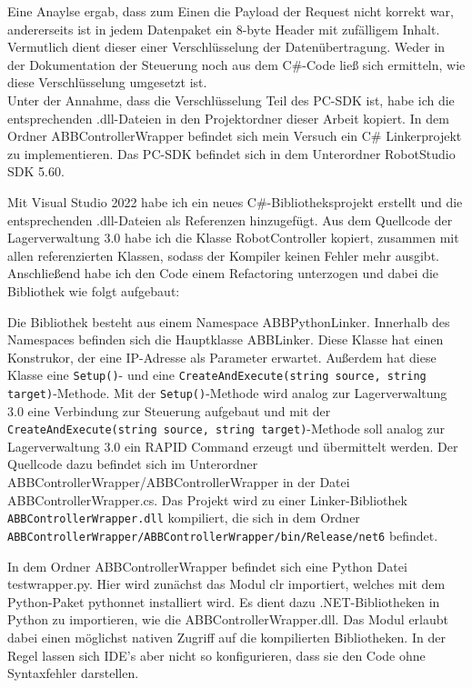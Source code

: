 Eine Anaylse ergab, dass zum Einen die Payload der Request nicht korrekt war, andererseits ist in jedem Datenpaket ein 8-byte Header mit zufälligem Inhalt.
Vermutlich dient dieser einer Verschlüsselung der Datenübertragung. 
Weder in der Dokumentation der Steuerung noch aus dem C\#-Code ließ sich ermitteln, wie diese Verschlüsselung umgesetzt ist.
\\

Unter der Annahme, dass die Verschlüsselung Teil des PC-SDK ist, habe ich die entsprechenden \glq .dll\grq{}-Dateien in den Projektordner dieser Arbeit kopiert.
In dem Ordner \grq ABBControllerWrapper\grq{} befindet sich mein Versuch ein C\# Linkerprojekt zu implementieren. 
Das PC-SDK befindet sich in dem Unterordner \grq RobotStudio SDK 5.60\grq{}.

Mit Visual Studio 2022 habe ich ein neues C\#-Bibliotheksprojekt erstellt und die entsprechenden \glq .dll\grq{}-Dateien als Referenzen hinzugefügt.
Aus dem Quellcode der Lagerverwaltung 3.0 habe ich die Klasse \glq RobotController\grq{} kopiert, zusammen mit allen referenzierten Klassen, sodass der Kompiler keinen Fehler mehr ausgibt.
Anschließend habe ich den Code einem Refactoring unterzogen und dabei die Bibliothek wie folgt aufgebaut:

Die Bibliothek besteht aus einem Namespace \glq ABBPythonLinker\grq{}.
Innerhalb des Namespaces befinden sich die Hauptklasse \glq ABBLinker\grq{}. 
Diese Klasse hat einen Konstrukor, der eine IP-Adresse als Parameter erwartet.
Außerdem hat diese Klasse eine \verb|Setup()|- und eine \verb|CreateAndExecute(string source, string target)|-Methode. 
Mit der \verb|Setup()|-Methode wird analog zur Lagerverwaltung 3.0 eine Verbindung zur Steuerung aufgebaut und mit der 
\verb|CreateAndExecute(string source, string target)|-Methode soll analog zur Lagerverwaltung 3.0 ein RAPID Command erzeugt und übermittelt werden.
Der Quellcode dazu befindet sich im Unterordner \glq ABBControllerWrapper/ABBControllerWrapper\grq{} in der Datei \glq ABBControllerWrapper.cs\grq{}.
Das Projekt wird zu einer Linker-Bibliothek \verb|ABBControllerWrapper.dll| kompiliert, die sich in dem Ordner \verb|ABBControllerWrapper/ABBControllerWrapper/bin/Release/net6| befindet.

In dem Ordner \glq ABBControllerWrapper \grq{} befindet sich eine Python Datei \glq testwrapper.py\grq{}.
Hier wird zunächst das Modul \glq clr\grq{} importiert, welches mit dem Python-Paket \glq pythonnet\grq{} installiert wird.
Es dient dazu .NET-Bibliotheken in Python zu importieren, wie die \glq ABBControllerWrapper.dll\grq{}.
Das Modul erlaubt dabei einen möglichst nativen Zugriff auf die kompilierten Bibliotheken. In der Regel lassen sich IDE's aber nicht so konfigurieren, 
dass sie den Code ohne Syntaxfehler darstellen.

